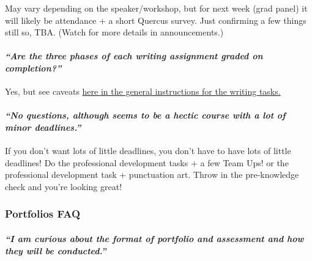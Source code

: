 \documentclass[
  openany]{book}
\begin{document}
May vary depending on the speaker/workshop, but for next week (grad panel) it will likely be attendance + a short Quercus survey. Just confirming a few things still so, TBA. (Watch for more details in announcements.)

\hypertarget{are-the-three-phases-of-each-writing-assignment-graded-on-completion}{%
\paragraph{\texorpdfstring{\emph{``Are the three phases of each writing assignment graded on completion?''}}{``Are the three phases of each writing assignment graded on completion?''}}\label{are-the-three-phases-of-each-writing-assignment-graded-on-completion}}

Yes, but see caveats \href{https://sta303-bolton.github.io/sta303-w22-courseguide/knowledge-basket-writing-and-peer-feedback.html\#general-instructions}{here in the general instructions for the writing tasks.}

\hypertarget{no-questions-although-seems-to-be-a-hectic-course-with-a-lot-of-minor-deadlines.}{%
\paragraph{\texorpdfstring{\emph{``No questions, although seems to be a hectic course with a lot of minor deadlines.''}}{``No questions, although seems to be a hectic course with a lot of minor deadlines.''}}\label{no-questions-although-seems-to-be-a-hectic-course-with-a-lot-of-minor-deadlines.}}

If you don't want lots of little deadlines, you don't have to have lots of little deadlines! Do the professional development tasks + a few Team Ups! or the professional development task + punctuation art. Throw in the pre-knowledge check and you're looking great!

\hypertarget{portfolios-faq}{%
\subsubsection{Portfolios FAQ}\label{portfolios-faq}}

\hypertarget{i-am-curious-about-the-format-of-portfolio-and-assessment-and-how-they-will-be-conducted.}{%
\paragraph{\texorpdfstring{\emph{``I am curious about the format of portfolio and assessment and how they will be conducted.''}}{``I am curious about the format of portfolio and assessment and how they will be conducted.''}}\label{i-am-curious-about-the-format-of-portfolio-and-assessment-and-how-they-will-be-conducted.}}
\end{document}
